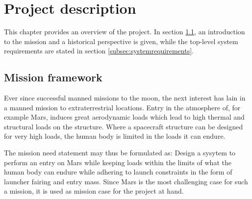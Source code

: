 \section{Project description}\label{cha:project_description}%
This chapter provides an overview of the project. In section \ref{subsec:missionframework}, an introduction to the mission and a historical perspective is given, while the top-level system requirements are stated in section \ref{subsec:systemrequirements}.

\subsection{Mission framework} 
\label{subsec:missionframework}
Ever since successful manned missions to the moon, the next interest has lain in a manned mission to extraterrestrial locations. Entry in the atmosphere of, for example Mars, induces great aerodynamic loads which lead to high thermal and structural loads on the structure. Where a spacecraft structure can be designed for very high loads, the human body is limited in the loads it can endure. 

The mission need statement may thus be formulated as: Design a sysytem to perform an entry on Mars while keeping loads within the limits of what the human body can endure while adhering to launch constraints in the form of launcher fairing and entry mass. Since Mars is the most challenging case for such a mission, it is used as mission case for the project at hand. \cite{projectguide}

